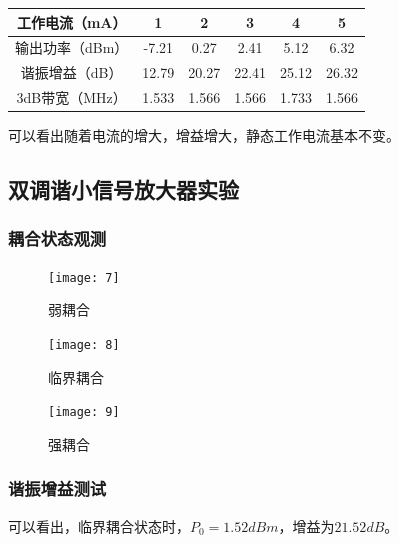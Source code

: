 \documentclass{../source/Experiment}
\begin{document}
            \begin{table}[H]
                \centering
                \begin{tabular}{|c|c|c|c|c|c|}
                \hline
                工作电流（mA）   & 1     & 2     & 3     & 4     & 5     \\ \hline
                输出功率（dBm）  & -7.21 & 0.27  & 2.41  & 5.12  & 6.32  \\ \hline
                谐振增益（dB）   & 12.79 & 20.27 & 22.41 & 25.12 & 26.32 \\ \hline
                3dB带宽（MHz） & 1.533 & 1.566 & 1.566 & 1.733 & 1.566 \\ \hline
                \end{tabular}
                \end{table}
            
            可以看出随着电流的增大，增益增大，静态工作电流基本不变。

        \subsection{双调谐小信号放大器实验}
            
            \subsubsection{耦合状态观测}

            \begin{figure}[H]
                \centering
                \texttt{[image: 7]}
                \caption{弱耦合}
            \end{figure}

            \begin{figure}[H]
                \centering
                \texttt{[image: 8]}
                \caption{临界耦合}
            \end{figure}

            \begin{figure}[H]
                \centering
                \texttt{[image: 9]}
                \caption{强耦合}
            \end{figure}
            
            \subsubsection{谐振增益测试}

            可以看出，临界耦合状态时，$P_0 = 1.52dBm$，增益为$21.52dB$。
            
\end{document}
